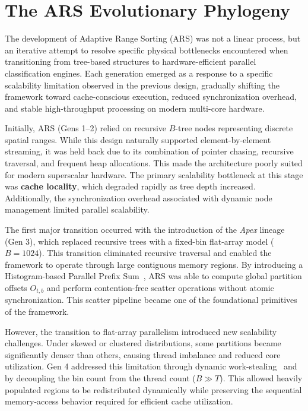 \section{The ARS Evolutionary Phylogeny}
The development of Adaptive Range Sorting (ARS) was not a linear process, but an iterative attempt to resolve specific physical bottlenecks encountered when transitioning from tree-based structures to hardware-efficient parallel classification engines.
Each generation emerged as a response to a specific scalability limitation observed in the previous design, gradually shifting the framework toward cache-conscious execution, reduced synchronization overhead, and stable high-throughput processing on modern multi-core hardware.

Initially, ARS (Gens 1--2) relied on recursive $B$-tree nodes representing discrete spatial ranges.
While this design naturally supported element-by-element streaming, it was held back due to its combination of pointer chasing, recursive traversal, and frequent heap allocations.
This made the architecture poorly suited for modern superscalar hardware.
The primary scalability bottleneck at this stage was \textbf{cache locality}, which degraded rapidly as tree depth increased. Additionally, the synchronization overhead associated with dynamic node management limited parallel scalability.

The first major transition occurred with the introduction of the \textit{Apex} lineage (Gen 3), which replaced recursive trees with a fixed-bin flat-array model ($B = 1024$). 
This transition eliminated recursive traversal and enabled the framework to operate through large contiguous memory regions. 
By introducing a Histogram-based Parallel Prefix Sum~\cite{blellochPrefixSumsTheir2018}, ARS was able to compute global partition offsets $O_{t,b}$ and perform contention-free scatter operations without atomic synchronization. 
This scatter pipeline became one of the foundational primitives of the framework.

However, the transition to flat-array parallelism introduced new scalability challenges. 
Under skewed or clustered distributions, some partitions became significantly denser than others, causing thread imbalance and reduced core utilization. 
Gen 4 addressed this limitation through dynamic work-stealing~\cite{blumofeSchedulingMultithreadedComputations1999} and by decoupling the bin count from the thread count ($B \gg T$). 
This allowed heavily populated regions to be redistributed dynamically while preserving the sequential memory-access behavior required for efficient cache utilization.

